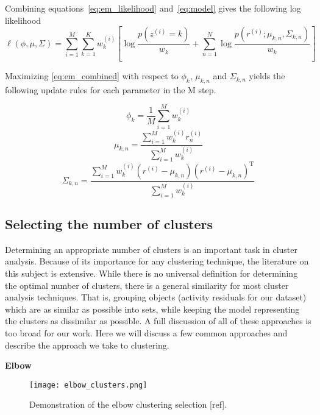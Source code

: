 Combining equations~\ref{eq:em_likelihood} and~\ref{eq:model} gives the following log likelihood
\begin{equation}
\label{eq:em_combined}
\ell(\phi, \mu, \Sigma) = \sum_{i = 1}^{M}\sum_{k = 1}^{K}w_{k}^{(i)} [\log \frac{p(z^{(i)} = k)}{w_{k}} + \sum_{n = 1}^{N} \log \frac{p(r^{(i)}; \mu_{k, n}, \Sigma_{k, n})}{w_{k}}]
\end{equation}

Maximizing \ref{eq:em_combined} with respect to $\phi_{k}$, $\mu_{k, n}$ and $\Sigma_{k, n}$ yields the following update rules for each parameter in the M step.

\begin{equation}
\phi_{k} = \frac{1}{M}\sum_{i = 1}^{M}w_{k}^{(i)}
\end{equation}
\begin{equation}
\mu_{k, n} = \frac{\sum_{i = 1}^{M}w_{k}^{(i)}r^{(i)}_{n}}{\sum_{i = 1}^{M}w_{k}^{(i)}}
\end{equation}
\begin{equation}
\Sigma_{k, n} = \frac{\sum_{i = 1}^{M}w_{k}^{(i)}(r^{(i)} - \mu_{k, n})(r^{(i)} - \mu_{k, n})^{\mathrm{T}}}{\sum_{i = 1}^{M}w_{k}^{(i)}}
\end{equation}


\subsection{Selecting the number of clusters}

Determining an appropriate number of clusters is an important task in cluster analysis.  Because of its importance for any clustering technique, the literature on this subject is extensive.  While there is no universal definition for determining the optimal number of clusters, there is a general similarity for most cluster analysis techniques.  That is, grouping objects (activity residuals for our dataset) which are as similar as possible into sets, while keeping the model representing the clusters as dissimilar as possible.    A full discussion of all of these approaches is too broad for our work.  Here we will discuss a few common approaches and describe the approach we take to clustering.

\bigskip
\noindent
\textbf{Elbow}

\begin{wrapfigure}{R}{0.4\textwidth}
\centering
\texttt{[image: elbow\_clusters.png]}
\caption{Demonstration of the elbow clustering selection [ref].}
\label{fig:elbow_cluster}
\end{wrapfigure}

